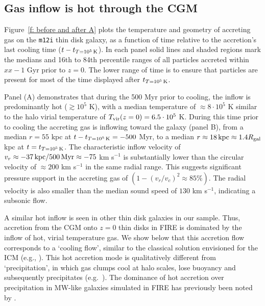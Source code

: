 \documentclass[fleqn,usenatbib]{mnras}
\newcommand{\tcon}{t_{T=10^5\,{\rm K}}}
\newcommand{\Tvir}{T_{\rm vir}}
\begin{document}
\subsection{Gas inflow is hot through the CGM}
\label{s: characteristics -- inflowing gas phase}

Figure~\ref{f: before and after A} plots the temperature and geometry of accreting gas on the \texttt{m12i} thin disk galaxy, as a function of time relative to the accretion's last cooling time ($t - \tcon$).
In each panel solid lines and shaded regions mark the medians and 16th to 84th percentile ranges of all particles accreted within $xx-1$ Gyr prior to $z=0$. The lower range of time is to ensure that particles are present for most of the time displayed after $\tcon$.

Panel (A) demonstrates that during the 500 Myr prior to cooling, the inflow is predominantly hot ($\gtrsim 10^5$ K), with a median temperature of $\approx8\cdot10^5$ K similar to the halo virial temperature of $\Tvir(z=0)=6.5\cdot10^5$ K. During this time prior to cooling the accreting gas is inflowing toward the galaxy (panel B), from a median $r=55$ kpc at $t-\tcon=-500$ Myr, to a median $r\approx18\,{\rm kpc}\approx1.4 R_{\rm gal}$ kpc at $t=\tcon$. The characteristic inflow velocity of $v_r\approx -37\,{\rm kpc}/500\,{\rm Myr}\approx-75$ km s$^{-1}$ is substantially lower than the circular velocity of $\approx200$ km s$^{-1}$ in the same radial range. This suggests significant pressure support in the accreting gas of $(1-(v_r/v_c)^2\approx85\%)$. The radial velocity is also smaller than the median sound speed of $130$ km s$^{-1}$, indicating a subsonic flow. 


A similar hot inflow is seen in other thin disk galaxies in our sample. Thus, accretion from the CGM onto $z=0$ thin disks in FIRE is dominated by the inflow of hot, virial temperature gas. We show below that this accretion flow corresponds to a `cooling flow', similar to the classical solution envisioned for the ICM (e.g., \citealt{Mathews1978}).  This hot accretion mode is qualitatively different from `precipitation', in which gas clumps cool at halo scales, lose buoyancy and subsequently precipitates (e.g.~\citealt{Maller2004,Voit2017}). The dominance of hot accretion over precipitation in MW-like galaxies simulated in FIRE has previously been noted by \cite{Esmerian2020}. 
\end{document}
